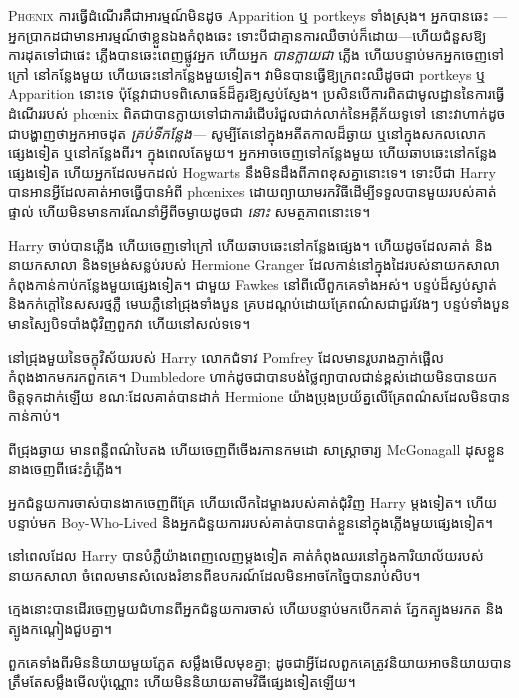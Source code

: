 
\lettrine{P}{hœnix} ការធ្វើដំណើរគឺជាអារម្មណ៍មិនដូច Apparition ឬ portkeys ទាំងស្រុង។ អ្នកបានឆេះ — អ្នកប្រាកដជាមានអារម្មណ៍ថាខ្លួនឯងកំពុងឆេះ ទោះបីជាគ្មានការឈឺចាប់ក៏ដោយ—ហើយជំនួសឱ្យការដុតទៅជាផេះ ភ្លើងបានឆេះពេញផ្លូវអ្នក ហើយអ្នក \emph{បានក្លាយជា} ភ្លើង ហើយបន្ទាប់មកអ្នកចេញទៅក្រៅ នៅកន្លែងមួយ ហើយឆេះនៅកន្លែងមួយទៀត។ វា​មិន​បាន​ធ្វើ​ឱ្យ​ក្រពះ​ឈឺ​ដូច​ជា portkeys ឬ Apparition នោះ​ទេ ប៉ុន្តែ​វា​ជា​បទពិសោធន៍​ដ៏​គួរ​ឱ្យ​ស្ញប់ស្ញែង។ ប្រសិនបើការពិតជាមូលដ្ឋាននៃការធ្វើដំណើររបស់ phœnix ពិតជាបានក្លាយទៅជាការរំជើបរំជួលជាក់លាក់នៃអគ្គីភ័យទូទៅ នោះវាហាក់ដូចជាបង្ហាញថាអ្នកអាចដុត \emph{គ្រប់ទីកន្លែង—} សូម្បីតែនៅក្នុងអតីតកាលដ៏ឆ្ងាយ ឬនៅក្នុងសកលលោកផ្សេងទៀត ឬនៅកន្លែងពីរ។ ក្នុងពេលតែមួយ។ អ្នកអាចចេញទៅកន្លែងមួយ ហើយឆាបឆេះនៅកន្លែងផ្សេងទៀត ហើយអ្នកដែលមកដល់ Hogwarts នឹងមិនដឹងពីភាពខុសគ្នានោះទេ។ ទោះបីជា Harry បានអានអ្វីដែលគាត់អាចធ្វើបានអំពី phœnixes ដោយព្យាយាមរកវិធីដើម្បីទទួលបានមួយរបស់គាត់ផ្ទាល់ ហើយមិនមានការណែនាំអ្វីពីចម្ងាយដូចជា \emph{នោះ} សមត្ថភាពនោះទេ។

Harry ចាប់បានភ្លើង ហើយចេញទៅក្រៅ ហើយឆាបឆេះនៅកន្លែងផ្សេង។ ហើយដូចដែលគាត់ និងនាយកសាលា និងទម្រង់សន្លប់របស់ Hermione Granger ដែលកាន់នៅក្នុងដៃរបស់នាយកសាលា កំពុងកាន់កាប់កន្លែងមួយផ្សេងទៀត។ ជាមួយ Fawkes នៅពីលើពួកគេទាំងអស់។ បន្ទប់ដ៏ស្ងប់ស្ងាត់ និងកក់ក្តៅនៃសសរថ្មភ្លឺ មេឃភ្លឺនៅជ្រុងទាំងបួន គ្របដណ្ដប់ដោយគ្រែពណ៌សជាជួរវែងៗ បន្ទប់ទាំងបួនមានស្បៃបិទបាំងជុំវិញពួកវា ហើយនៅសល់ទទេ។

នៅជ្រុងមួយនៃចក្ខុវិស័យរបស់ Harry លោកជំទាវ Pomfrey ដែលមានរូបរាងភ្ញាក់ផ្អើលកំពុងងាកមករកពួកគេ។ Dumbledore ហាក់​ដូចជា​បាន​បង់​ថ្លៃ​ព្យាបាល​ជាន់​ខ្ពស់​ដោយ​មិន​បាន​យក​ចិត្ត​ទុក​ដាក់​ឡើយ ខណៈ​ដែល​គាត់​បាន​ដាក់ Hermione យ៉ាង​ប្រុងប្រយ័ត្ន​លើ​គ្រែ​ពណ៌​ស​ដែល​មិន​បាន​កាន់កាប់។

ពីជ្រុងឆ្ងាយ មានពន្លឺពណ៌បៃតង ហើយចេញពីចើងរកានកមដោ សាស្ត្រាចារ្យ McGonagall ដុសខ្លួននាងចេញពីផេះភ្នំភ្លើង។

អ្នកជំនួយការចាស់បានងាកចេញពីគ្រែ ហើយលើកដៃម្ខាងរបស់គាត់ជុំវិញ Harry ម្តងទៀត។ ហើយបន្ទាប់មក Boy-Who-Lived និងអ្នកជំនួយការរបស់គាត់បានបាត់ខ្លួននៅក្នុងភ្លើងមួយផ្សេងទៀត។

\later

នៅពេលដែល Harry បានបំភ្លឺយ៉ាងពេញលេញម្តងទៀត គាត់កំពុងឈរនៅក្នុងការិយាល័យរបស់នាយកសាលា ចំពេលមានសំលេងរំខានពីឧបករណ៍ដែលមិនអាចកែច្នៃបានរាប់សិប។

ក្មេងនោះបានដើរចេញមួយជំហានពីអ្នកជំនួយការចាស់ ហើយបន្ទាប់មកបើកគាត់ ភ្នែកត្បូងមរកត និងត្បូងកណ្តៀងជួបគ្នា។

ពួកគេទាំងពីរមិននិយាយមួយភ្លែត សម្លឹងមើលមុខគ្នា; ដូច​ជា​អ្វី​ដែល​ពួក​គេ​ត្រូវ​និយាយ​អាច​និយាយ​បាន​ត្រឹម​តែ​សម្លឹង​មើល​ប៉ុណ្ណោះ ហើយ​មិន​និយាយ​តាម​វិធី​ផ្សេង​ទៀត​ឡើយ។

